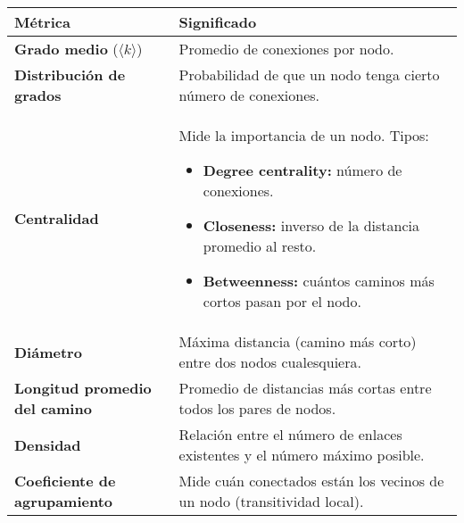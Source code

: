 \begin{center}
\begin{tabular}{@{}lp{10.5cm}@{}}
\toprule
\textbf{Métrica} & \textbf{Significado} \\
\midrule
\textbf{Grado medio} (\( \langle k \rangle \)) & Promedio de conexiones por nodo. \\
\textbf{Distribución de grados} & Probabilidad de que un nodo tenga cierto número de conexiones. \\
\textbf{Centralidad} & Mide la importancia de un nodo. Tipos: 
\begin{itemize}
    \item \textbf{Degree centrality:} número de conexiones.
    \item \textbf{Closeness:} inverso de la distancia promedio al resto.
    \item \textbf{Betweenness:} cuántos caminos más cortos pasan por el nodo.
\end{itemize} \\
\textbf{Diámetro} & Máxima distancia (camino más corto) entre dos nodos cualesquiera. \\
\textbf{Longitud promedio del camino} & Promedio de distancias más cortas entre todos los pares de nodos. \\
\textbf{Densidad} & Relación entre el número de enlaces existentes y el número máximo posible. \\
\textbf{Coeficiente de agrupamiento} & Mide cuán conectados están los vecinos de un nodo (transitividad local). \\
\bottomrule
\end{tabular}
\end{center}
